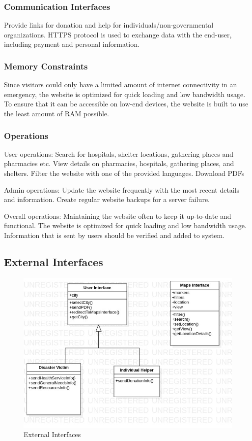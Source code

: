 \documentclass[12pt]{report}
\begin{document}
\subsubsection*{Communication Interfaces}
Provide links for donation and help for individuals/non-governmental organizations. HTTPS protocol 
is used to exchange data with the end-user, including payment and personal information.

\subsubsection*{Memory Constraints}
Since visitors could only have a limited amount of internet connectivity in an emergency, the
website is optimized for quick loading and low bandwidth usage. To ensure that it can be accessible
on low-end devices, the website is built to use the least amount of RAM possible.

\subsubsection*{Operations}
User operations: Search for hospitals, shelter locations, gathering places and pharmacies etc.
View details on pharmacies, hospitals, gathering places, and shelters. Filter the website with one of
the provided languages. Download PDFs

Admin operations: Update the website frequently with the most recent details and information. Create regular
website backups for a server failure.

Overall operations: Maintaining the website often to keep it up-to-date and functional. The website
is optimized for quick loading and low bandwidth usage. Information that is sent by users should
be verified and added to system.

\subsection{External Interfaces}

\begin{figure}[H]
    \includegraphics[scale=0.5]{ext1}
    \centering
    \caption{External Interfaces}
\end{figure}
\end{document}
